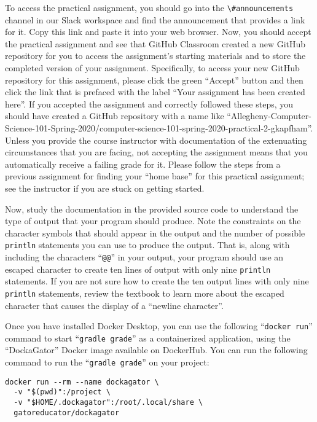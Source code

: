 \documentclass[11pt]{article}
\newcommand{\command}[1]{``\lstinline{#1}''}
\newcommand{\channel}[1]{\lstinline{#1}}
\begin{document}
To access the practical assignment, you should go into the
\channel{\#announcements} channel in our Slack workspace and find the
announcement that provides a link for it. Copy this link and paste it into your
web browser. Now, you should accept the practical assignment and see that
GitHub Classroom created a new GitHub repository for you to access the
assignment's starting materials and to store the completed version of your
assignment. Specifically, to access your new GitHub repository for this
assignment, please click the green ``Accept'' button and then click the link
that is prefaced with the label ``Your assignment has been created here''. If
you accepted the assignment and correctly followed these steps, you should have
created a GitHub repository with a name like
``Allegheny-Computer-Science-101-Spring-2020/computer-science-101-spring-2020-practical-2-gkapfham''.
Unless you provide the course instructor with documentation of the extenuating
circumstances that you are facing, not accepting the assignment means that you
automatically receive a failing grade for it. Please follow the steps from a
previous assignment for finding your ``home base'' for this practical
assignment; see the instructor if you are stuck on getting started.

Now, study the documentation in the provided source code to understand the type
of output that your program should produce. Note the constraints on the
character symbols that should appear in the output and the number of possible
{\tt println} statements you can use to produce the output. That is, along with
including the characters ``{\tt @@}'' in your output, your program should use an
escaped character to create ten lines of output with only nine {\tt println}
statements. If you are not sure how to create the ten output lines with only
nine {\tt println} statements, review the textbook to learn more about the
escaped character that causes the display of a ``newline character''.

Once you have installed Docker Desktop, you can use the following
\command{docker run} command to start \command{gradle grade} as a containerized
application, using the ``DockaGator'' Docker image available on DockerHub. You
can run the following command to run the \command{gradle grade} on your project:

\vspace*{-.05in}
\begin{verbatim}
docker run --rm --name dockagator \
  -v "$(pwd)":/project \
  -v "$HOME/.dockagator":/root/.local/share \
  gatoreducator/dockagator
\end{verbatim}
\vspace*{-.05in}
\end{document}
